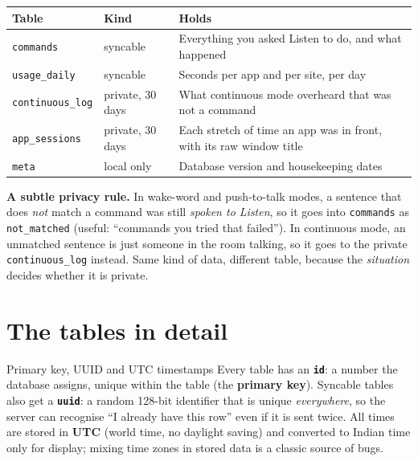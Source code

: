 \documentclass[11pt,a4paper]{article}
\begin{document}
\begin{center}
\renewcommand{\arraystretch}{1.2}
\begin{tabularx}{\textwidth}{l l X}
\toprule
\textbf{Table} & \textbf{Kind} & \textbf{Holds} \\
\midrule
\texttt{commands}        & \textcolor{cloud}{syncable} & Everything you asked Listen to do, and what happened \\
\texttt{usage\_daily}    & \textcolor{cloud}{syncable} & Seconds per app and per site, per day \\
\texttt{continuous\_log} & \textcolor{warn}{private, 30 days} & What continuous mode overheard that was not a command \\
\texttt{app\_sessions}   & \textcolor{warn}{private, 30 days} & Each stretch of time an app was in front, with its raw window title \\
\texttt{meta}            & local only & Database version and housekeeping dates \\
\bottomrule
\end{tabularx}
\end{center}

\begin{caution}
\textbf{A subtle privacy rule.} In wake-word and push-to-talk modes, a sentence that does
\emph{not} match a command was still \emph{spoken to Listen}, so it goes into \texttt{commands}
as \texttt{not\_matched} (useful: ``commands you tried that failed''). In continuous mode, an
unmatched sentence is just someone in the room talking, so it goes to the private
\texttt{continuous\_log} instead. Same kind of data, different table, because the
\emph{situation} decides whether it is private.
\end{caution}

\section{The tables in detail}

\begin{concept}{Primary key, UUID and UTC timestamps}
Every table has an \textbf{\texttt{id}}: a number the database assigns, unique within the table
(the \textbf{primary key}). Syncable tables also get a \textbf{\texttt{uuid}}: a random
128-bit identifier that is unique \emph{everywhere}, so the server can recognise ``I already
have this row'' even if it is sent twice. All times are stored in \textbf{UTC} (world time,
no daylight saving) and converted to Indian time only for display; mixing time zones in
stored data is a classic source of bugs.
\end{concept}
\end{document}
